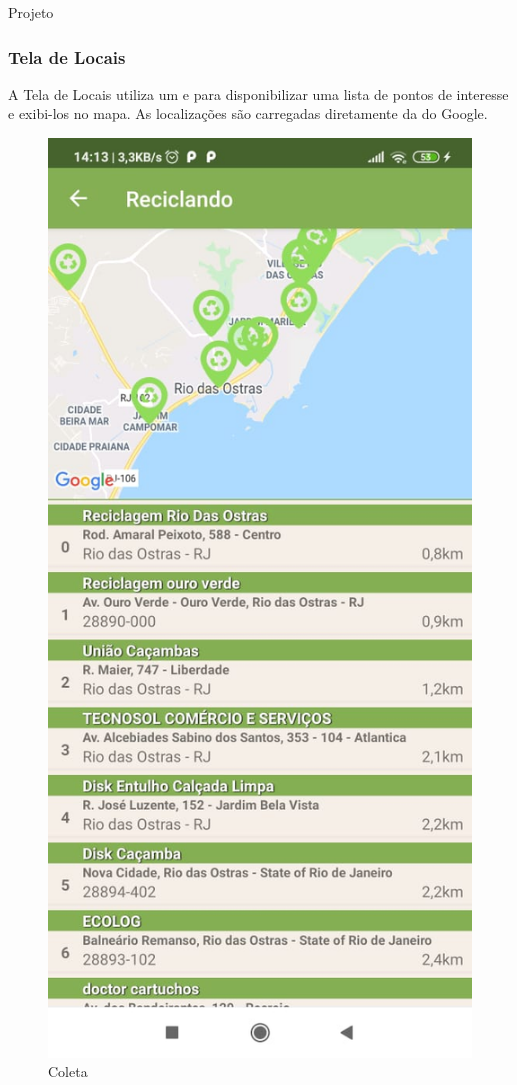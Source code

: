 \documentclass[
	12pt,				%
	openany,			%
	twoside,			%
	a4paper,			%
	english,			%
	french,				%
	spanish,			%
	brazil				%
	]{abntex2}
\begin{document}
\begin{chapter}{Projeto}
\newpage
\subsubsection{Tela de Locais}
A Tela de Locais utiliza um  e  para disponibilizar uma lista de pontos de interesse e exibi-los no mapa. As localizações são carregadas diretamente da  do Google.

    \begin{figure}[htb]    
 \centering
  \begin{minipage}{0.45\textwidth}
    \centering
    \caption{Coleta}
    \includegraphics[scale=0.35]{media/tela_location_1.jpeg}

\end{minipage}
\end{figure}
\end{chapter}
\end{document}
